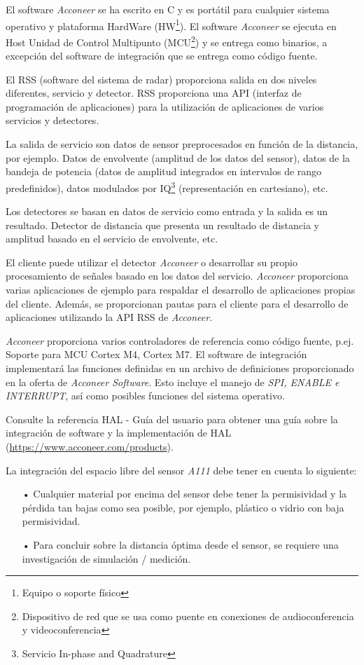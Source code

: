 El software \textit{Acconeer} se ha escrito en C y es portátil para cualquier sistema operativo y plataforma HardWare (HW\footnote{Equipo o soporte físico}). El software \textit{Acconeer} se ejecuta en Host Unidad de Control Multipunto (MCU\footnote{Dispositivo de red que se usa como puente en conexiones de audioconferencia y videoconferencia}) y se entrega como binarios, a excepción del software de integración que se entrega como código fuente.

El RSS (software del sistema de radar) proporciona salida en dos niveles diferentes, servicio y detector. RSS proporciona una API (interfaz de programación de aplicaciones) para la utilización de aplicaciones de varios servicios y detectores.

La salida de servicio son datos de sensor preprocesados en función de la distancia, por ejemplo. Datos de envolvente (amplitud de los datos del sensor), datos de la bandeja de potencia (datos de amplitud integrados en intervalos de rango predefinidos), datos modulados por IQ\footnote{Servicio In-phase and Quadrature} (representación en cartesiano), etc.

Los detectores se basan en datos de servicio como entrada y la salida es un resultado. Detector de distancia que presenta un resultado de distancia y amplitud basado en el servicio de envolvente, etc.

El cliente puede utilizar el detector \textit{Acconeer} o desarrollar su propio procesamiento de señales basado en los datos del servicio.
\textit{Acconeer} proporciona varias aplicaciones de ejemplo para respaldar el desarrollo de aplicaciones propias del cliente. Además, se proporcionan pautas para el cliente para el desarrollo de aplicaciones utilizando la API RSS de \textit{Acconeer}.

\textit{Acconeer} proporciona varios controladores de referencia como código fuente, p.ej. Soporte para MCU Cortex M4, Cortex M7.
El software de integración implementará las funciones definidas en un archivo de definiciones proporcionado en la oferta de \textit{Acconeer Software}. Esto incluye el manejo de \textit{SPI, ENABLE e INTERRUPT}, así como posibles funciones del sistema operativo.

Consulte la referencia HAL - Guía del usuario para obtener una guía sobre la integración de software y la implementación de HAL (\url{https://www.acconeer.com/products}).

La integración del espacio libre del sensor \textit{A111} debe tener en cuenta lo siguiente:
\begin{itemize}
\item[•] Cualquier material por encima del sensor debe tener la permisividad y la pérdida tan bajas como sea posible, por ejemplo, plástico o vidrio con baja permisividad.
\item[•] Para concluir sobre la distancia óptima desde el sensor, se requiere una investigación de simulación / medición.
\end{itemize}

